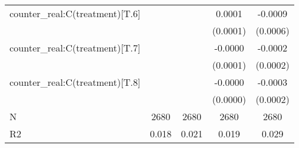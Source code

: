 \begin{table}
\begin{center}
\begin{tabular}{lcccc}
counter\_real:C(treatment)[T.6] &                    &                     & 0.0001               & -0.0009                \\
                                &                    &                     & (0.0001)             & (0.0006)               \\
counter\_real:C(treatment)[T.7] &                    &                     & -0.0000              & -0.0002                \\
                                &                    &                     & (0.0001)             & (0.0002)               \\
counter\_real:C(treatment)[T.8] &                    &                     & -0.0000              & -0.0003                \\
                                &                    &                     & (0.0000)             & (0.0002)               \\
N                               & 2680               & 2680                & 2680                 & 2680                   \\
R2                              & 0.018              & 0.021               & 0.019                & 0.029                  \\
\hline
\end{tabular}
\end{center}
\end{table}